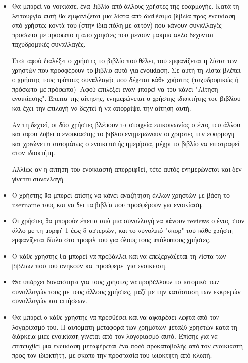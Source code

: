 \documentclass[12pt,a4paper]{article}
\begin{document}
\begin{itemize}
	\item Θα μπορεί να νοικιάσει ένα βιβλίο από άλλους χρήστες της εφαρμογής. Κατά τη λειτουργία αυτή θα εμφανίζεται μια λίστα από διαθέσιμα βιβλία προς ενοικίαση από χρήστες κοντά του (στην ίδια πόλη με αυτόν) που κάνουν συναλλαγές πρόσωπο με πρόσωπο ή από χρήστες που μένουν μακριά αλλά δέχονται ταχυδρομικές συναλλαγές. 

Έτσι αφού διαλέξει ο χρήστης το βιβλίο που θέλει, του εμφανίζεται η λίστα των χρηστών που προσφέρουν το βιβλίο αυτό για ενοικίαση. Σε αυτή τη λίστα βλέπει ο χρήστης τους τρόπους συναλλαγής που δέχεται κάθε χρήστης (ταχυδρομικώς ή πρόσωπο με πρόσωπο). Αφού επιλέξει έναν μπορεί να του κάνει "Αίτηση ενοικίασης". Έπειτα της αίτησης, ενημερώνεται ο χρήστης-ιδιοκτήτης του βιβλίου και έχει την επιλογή να δεχτεί ή να απορρίψει την αίτηση αυτή.

Αν τη δεχτεί, οι δύο χρήστες βλέπουν τα στοιχεία επικοινωνίας ο ένας του άλλου και αφού λάβει ο ενοικιαστής το βιβλίο ενημερώνουν οι χρήστες την εφαρμογή και χρεώνεται αυτομάτως ο ενοικιαστής ημερήσια, μέχρι το βιβλίο να επιστραφεί στον ιδιοκτήτη. 

Αλλίως αν η αίτηση του ενοικιαστή απορριφθεί, τότε αυτός ενημερώνεται και δεν γίνεται συναλλαγή.

	\item Ο χρήστης θα μπορεί επίσης να κάνει αναζήτηση άλλων χρηστών με βάση το username τους και να δει τα βιβλία που προσφέρουν για ενοικίαση.

	\item Οι χρήστες θα μπορούν έπειτα από μια συναλλαγή να κάνουν reviews ο ένας στον άλλο με τη μορφή 1 έως 5 αστεριών, και το συνολικό "σκορ" του κάθε χρήστη εμφανίζεται δίπλα στο προφιλ του για όλους τους υπόλοιπους χρήστες.

	\item Ο κάθε χρήστης θα μπορεί να προβάλλει και να επεξεργάζεται τη λίστα των βιβλιών που του ανήκουν και προσφέρει για ενοικίαση.

	\item Θα υπάρχει δυνατότητα για τους χρήστες να προβάλλουν το ιστορικό των συναλλαγών τους με τους άλλους χρήστες, μαζί με την κατάσταση των εκκρεμών συναλλαγών και αιτήσεων.

	\item Θα μπορεί ο κάθε χρήστης να προσθέσει και να αφαιρέσει λεφτά από τον λογαριασμό του. Η αυτόματη μεταφορά των χρημάτων μεταξύ χρηστών κατά τη διάρκεια μιας ενοικίαση γίνεται από τον λογαριασμό αυτό. Επίσης για να επιτευχθεί μια ενοικίαση μεταφέρεται ένα ποσό προκαταβολής από τον ενοικιαστή προς τον ιδιοκτήτη, με σκοπό την προστασία του ιδιοκτήτη από κλοπή.


\end{itemize}
\end{document}
